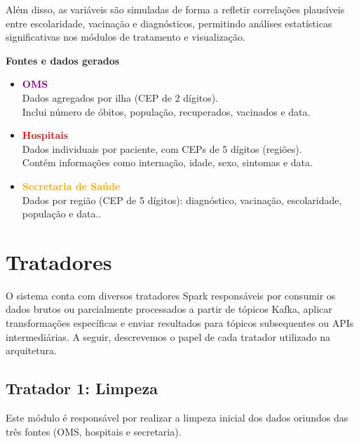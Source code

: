 \documentclass[a4paper,12pt]{article}
\begin{document}
Além disso, as variáveis são simuladas de forma a refletir correlações plausíveis entre escolaridade, vacinação e diagnósticos, permitindo análises estatísticas significativas nos módulos de tratamento e visualização.


\vspace{0.5cm}

\textbf{Fontes e dados gerados}

\begin{itemize}
    \item \textcolor{purple}{\textbf{OMS}}\\
    Dados agregados por ilha (CEP de 2 dígitos).\\
    Inclui número de óbitos, população, recuperados, vacinados e data.
    
    \vspace{0.5em}
    
    \item \textcolor{red}{\textbf{Hospitais }}\\
    Dados individuais por paciente, com CEPs de 5 dígitos (regiões).\\
    Contém informações como internação, idade, sexo, sintomas e data.
    
    \vspace{0.5em}
    
    \item \textcolor{orange}{\textbf{Secretaria de Saúde}}\\
    Dados por região (CEP de 5 dígitos): diagnóstico, vacinação, escolaridade, população e data..
\end{itemize}


\section{Tratadores}

O sistema conta com diversos tratadores Spark responsáveis por consumir os dados brutos ou parcialmente processados a partir de tópicos Kafka, aplicar transformações específicas e enviar resultados para tópicos subsequentes ou APIs intermediárias. A seguir, descrevemos o papel de cada tratador utilizado na arquitetura.

\subsection{Tratador 1: Limpeza}

Este módulo é responsável por realizar a limpeza inicial dos dados oriundos das três fontes (OMS, hospitais e secretaria). 
\end{document}
